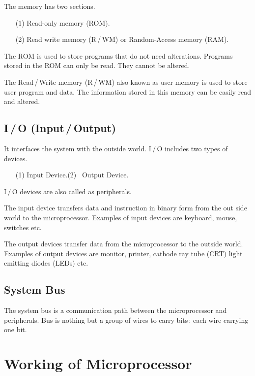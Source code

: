 The memory has two sections.
\begin{itemize}
\item[(1)] Read-only memory (ROM).

\item[(2)] Read write memory (R\,/\,WM) or Random-Access memory (RAM).
\end{itemize}

The ROM is used to store programs that do not need alterations. Programs stored in the ROM can only be read. They cannot be altered.

The Read\,/\,Write memory (R\,/\,WM) also known as user memory is used to store user program and data. The information stored in this memory can be easily read and altered.

\subsection{I\,/\,O (Input\,/\,Output)}\label{sec7.4.5}

It interfaces the system with the outside world. I\,/\,O includes two types of devices.
\begin{itemize}
\item[(1)] Input Device.\qquad\quad (2)~ Output Device.
\end{itemize}
I\,/\,O devices are also called as peripherals.

The input device transfers data and instruction in binary form from the out side world to the microprocessor. Examples of input devices are keyboard, mouse, switches etc.

The output devices transfer data from the microprocessor to the outside world. Examples of output devices are monitor, printer, cathode ray tube (CRT) light emitting diodes (LEDs) etc.

\subsection{System Bus}\label{sec7.4.6}

The system bus is a communication path between the microprocessor and peripherals. Bus is nothing but a group of wires to carry bits\,: each wire carrying one bit.

\section{Working of Microprocessor}\label{sec7.5}

